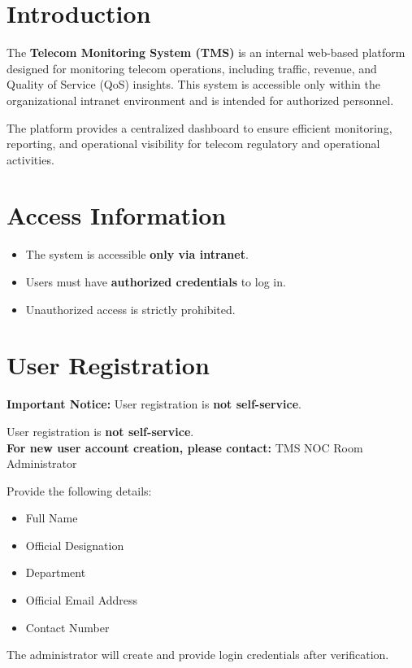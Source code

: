 \section{Introduction}
The \textbf{Telecom Monitoring System (TMS)} is an internal web-based platform designed for monitoring telecom operations, including traffic, revenue, and Quality of Service (QoS) insights. This system is accessible only within the organizational intranet environment and is intended for authorized personnel.

The platform provides a centralized dashboard to ensure efficient monitoring, reporting, and operational visibility for telecom regulatory and operational activities.

\section{Access Information}
\begin{itemize}[label=--]
    \item The system is accessible \textbf{only via intranet}.
    \item Users must have \textbf{authorized credentials} to log in.
    \item Unauthorized access is strictly prohibited.
\end{itemize}

\section{User Registration}
\begin{tcolorbox}[colback=yellow!10]
\textbf{Important Notice:} User registration is \textbf{not self-service}.

User registration is \textbf{not self-service}.\\
\textbf{For new user account creation, please contact:}
{TMS NOC Room Administrator}
\end{tcolorbox}
Provide the following details:
\begin{itemize}
    \item Full Name
    \item Official Designation
    \item Department
    \item Official Email Address
    \item Contact Number
\end{itemize}
The administrator will create and provide login credentials after verification.
\newpage

